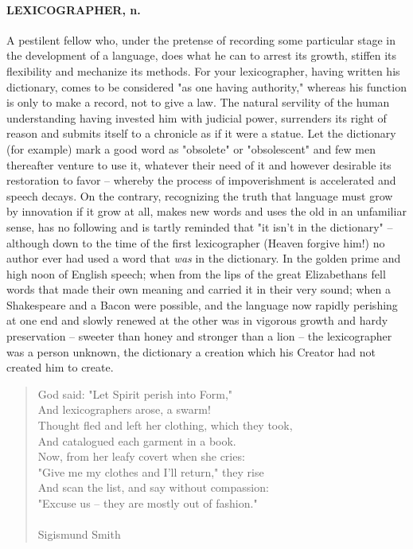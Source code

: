 \documentclass[11pt]{article}
\begin{document}
\paragraph{LEXICOGRAPHER, n.}  A pestilent fellow who, under the pretense of
recording some particular stage in the development of a language, does
what he can to arrest its growth, stiffen its flexibility and
mechanize its methods.  For your lexicographer, having written his
dictionary, comes to be considered "as one having authority," whereas
his function is only to make a record, not to give a law.  The natural
servility of the human understanding having invested him with judicial
power, surrenders its right of reason and submits itself to a
chronicle as if it were a statue.  Let the dictionary (for example)
mark a good word as "obsolete" or "obsolescent" and few men
thereafter venture to use it, whatever their need of it and however
desirable its restoration to favor -- whereby the process of
impoverishment is accelerated and speech decays.  On the contrary,
recognizing the truth that language must grow by innovation if it grow
at all, makes new words and uses the old in an unfamiliar sense, has
no following and is tartly reminded that "it isn't in the dictionary"
-- although down to the time of the first lexicographer (Heaven
forgive him!) no author ever had used a word that {\em was} in the
dictionary.  In the golden prime and high noon of English speech; when
from the lips of the great Elizabethans fell words that made their own
meaning and carried it in their very sound; when a Shakespeare and a
Bacon were possible, and the language now rapidly perishing at one end
and slowly renewed at the other was in vigorous growth and hardy
preservation -- sweeter than honey and stronger than a lion -- the
lexicographer was a person unknown, the dictionary a creation which
his Creator had not created him to create.

\begin{quote}   God said:  "Let Spirit perish into Form," \\
  And lexicographers arose, a swarm! \\
  Thought fled and left her clothing, which they took, \\
  And catalogued each garment in a book. \\
  Now, from her leafy covert when she cries: \\
  "Give me my clothes and I'll return," they rise \\
  And scan the list, and say without compassion: \\
  "Excuse us -- they are mostly out of fashion." \\
 \\
Sigismund Smith \end{quote}
\end{document}
